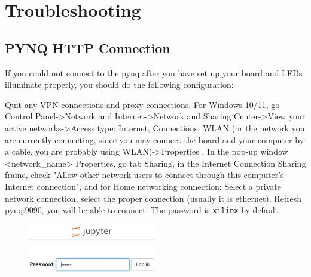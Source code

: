 \documentclass[a4paper,12pt,twoside]{article}
\begin{document}
\section{Troubleshooting}\label{A2}
\subsection{PYNQ HTTP Connection}
If you could not connect to the pynq after you have set up your board and LEDs illuminate properly, you should do the following configuration:

Quit any VPN connections and proxy connections. For Windows 10/11, go Control Panel->Network and Internet->Network and Sharing Center->View your active networks->Access type: Internet, Connections: WLAN (or the network you are currently connecting, since you may connect the board and your computer by a cable, you are probably using WLAN)->Properties \cite{pynqhttp}. In the pop-up window <network\_name> Properties, go tab Sharing, in the Internet Connection Sharing frame, check "Allow other network users to connect through this computer's Internet connection", and for Home networking connection: Select a private network connection, select the proper connection (usually it is ethernet). Refresh pynq:9090, you will be able to connect. The password is \texttt{xilinx} by default.
\begin{figure}[H]
    \centering
    \includegraphics[width=0.5\textwidth]{images/10.png}
\end{figure}

\printbibliography
\end{document}
